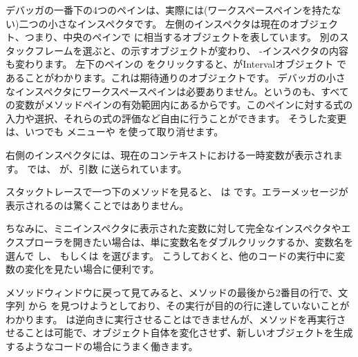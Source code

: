 \documentclass[a4paper,10pt,twoside]{book}
\begin{document}
デバッガの一番下の4つのペインは、実際には(ワークスペースペインを持たない)二つの小さなインスペクタです。
左側のインスペクタは現在のオブジェクト、つまり、中央のペインで \self に相当するオブジェクトを表しています。
別のスタックフレームを選ぶと、\self の示すオブジェクトが変わり、
\self{}-インスペクタの内容も変わります。
左下のペインの \self をクリックすると、\self がIntervalオブジェクト  であることがわかります。これは期待通りのオブジェクトです。
デバッガの小さなインスペクタにワークスペースペインは必要ありません。というのも、すべての変数がメソッドペインの有効範囲内にあるからです。このペインに対する式の入力や選択、それらの式の評価など自由に行うことができます。
そうした変更は、いつでも  メニューや  を使って取り消せます。

右側のインスペクタには、現在のコンテキストにおける一時変数が表示されます。
 では、
 が、引数  に送られています。


スタックトレースで一つ下のメソッドを見ると、 は  です。エラーメッセージが表示されるのは驚くことではありません。

ちなみに、ミニインスペクタに表示された変数に対して完全なインスペクタやエクスプローラを開きたい場合は、単に変数名をダブルクリックするか、変数名を選んで \actclick し、 もしくは  を選びます。
こうしておくと、他のコードの実行中に変数の変化を見たい場合に便利です。

メソッドウィンドウに戻って見てみると、メソッドの最後から2番目の行で、文字列  から  を見つけようとしており、その実行が目的の行に達していないことがわかります。
\pharo は逆向きに実行させることはできませんが、メソッドを再実行させることは可能で、オブジェクト自体を変化させず、新しいオブジェクトを生成するようなコードの場合にうまく働きます。

\end{document}
